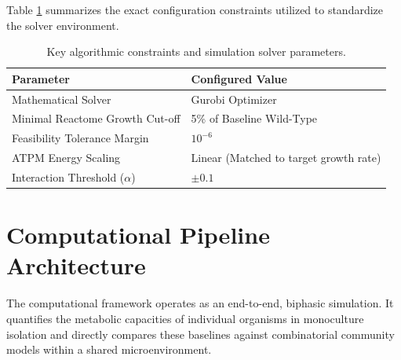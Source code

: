 \documentclass[11pt, a4paper]{article}
\begin{document}
Table \ref{tab:parameters} summarizes the exact configuration constraints utilized to standardize the solver environment.

\begin{table}[htbp]
    \centering
    \renewcommand{\arraystretch}{1.2}
    \begin{tabular}{|l|l|}
        \hline
        \textbf{Parameter} & \textbf{Configured Value} \\
        \hline
        Mathematical Solver & Gurobi Optimizer \\ \hline
        Minimal Reactome Growth Cut-off & 5\% of Baseline Wild-Type \\ \hline
        Feasibility Tolerance Margin & $10^{-6}$ \\ \hline
        ATPM Energy Scaling & Linear (Matched to target growth rate) \\ \hline
        Interaction Threshold ($\alpha$) & $\pm 0.1$ \\ \hline
    \end{tabular}
    \vspace{0.2cm}
    \caption{Key algorithmic constraints and simulation solver parameters.}
    \label{tab:parameters}
\end{table}

\section{Computational Pipeline Architecture}
The computational framework operates as an end-to-end, biphasic simulation. It quantifies the metabolic capacities of individual organisms in monoculture isolation and directly compares these baselines against combinatorial community models within a shared microenvironment.
\end{document}
